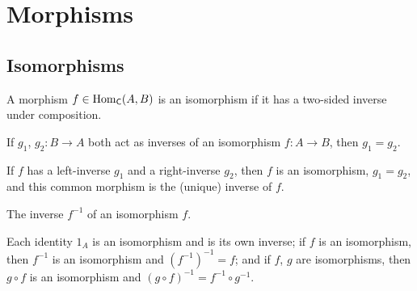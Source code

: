 \section{Morphisms}
\label{sec:prelims:morphisms}

\subsection{Isomorphisms}
\label{subsec:prelims:isomorphisms}

\begin{definition}[Isomorphism]
  \label{def:prelims:category-is-iso}
  \leanok
  A morphism $f \in \operatorname{Hom}_{\mathsf{C}}(A,B)$ is an isomorphism if it has
  a two-sided inverse under composition.
\end{definition}

\begin{proposition}
  \label{prop:prelims:iso-unique-inverse}
  If $g_1$, $g_2 : B \to A$ both act as inverses of an isomorphism
  $f : A \to B$, then $g_1 = g_2$.
\end{proposition}

\begin{proposition}
  \label{prop:prelims:iso-of-left-right-inverse}
  If $f$ has a left-inverse $g_1$ and a right-inverse $g_2$, then $f$
  is an isomorphism, $g_1 = g_2$, and this common morphism is the
  (unique) inverse of $f$.
\end{proposition}

\begin{definition}
  \label{def:prelims:category-iso-inv}
  \leanok
  The inverse $f^{-1}$ of an isomorphism $f$.
\end{definition}

\begin{proposition}
  \label{prop:prelims:iso-props}
  Each identity $1_A$ is an isomorphism and is its own inverse; if
  $f$ is an isomorphism, then $f^{-1}$ is an isomorphism and
  ${(f^{-1})}^{-1} = f$; and if $f$, $g$ are isomorphisms, then
  $g \circ f$ is an isomorphism and
  ${(g \circ f)}^{-1} = f^{-1} \circ g^{-1}$.
\end{proposition}

